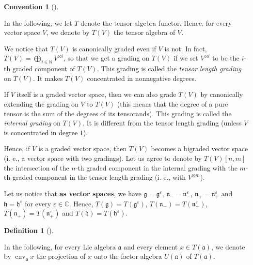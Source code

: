 \documentclass
[numbers=enddot,12pt,final,onecolumn,german,notitlepage]{scrartcl}%
\theoremstyle{definition}
\newtheorem{defi}[theo]{Definition}
\newenvironment{definition}[1][]
{\begin{defi}[#1]\begin{leftbar}}
{\end{leftbar}\end{defi}}
\newtheorem{conv}[theo]{Convention}
\newenvironment{Convention}[1][]
{\begin{conv}[#1]\begin{leftbar}}
{\end{leftbar}\end{conv}}
\begin{document}
\begin{Convention}
In the following, we let $T$ denote the tensor algebra functor. Hence, for
every vector space $V$, we denote by $T\left(  V\right)  $ the tensor algebra
of $V$.

We notice that $T\left(  V\right)  $ is canonically graded even if $V$ is not.
In fact, $T\left(  V\right)  =\bigoplus\limits_{i\in\mathbb{N}}V^{\otimes i}$,
so that we get a grading on $T\left(  V\right)  $ if we set $V^{\otimes i}$ to
be the $i$-th graded component of $T\left(  V\right)  $. This grading is
called the \textit{tensor length grading} on $T\left(  V\right)  $. It makes
$T\left(  V\right)  $ concentrated in nonnegative degrees.

If $V$ itself is a graded vector space, then we can also grade $T\left(
V\right)  $ by canonically extending the grading on $V$ to $T\left(  V\right)
$ (this means that the degree of a pure tensor is the sum of the degrees of
its tensorands). This grading is called the \textit{internal grading} on
$T\left(  V\right)  $. It is different from the tensor length grading (unless
$V$ is concentrated in degree $1$).

Hence, if $V$ is a graded vector space, then $T\left(  V\right)  $ becomes a
bigraded vector space (i. e., a vector space with two gradings). Let us agree
to denote by $T\left(  V\right)  \left[  n,m\right]  $ the intersection of the
$n$-th graded component in the internal grading with the $m$-th graded
component in the tensor length grading (i. e., with $V^{\otimes m}$).
\end{Convention}

Let us notice that \textbf{as vector spaces}, we have $\mathfrak{g}%
=\mathfrak{g}^{\varepsilon}$, $\mathfrak{n}_{-}=\mathfrak{n}_{-}^{\varepsilon
}$, $\mathfrak{n}_{+}=\mathfrak{n}_{+}^{\varepsilon}$ and $\mathfrak{h}%
=\mathfrak{h}^{\varepsilon}$ for every $\varepsilon\in\mathbb{C}$. Hence,
$T\left(  \mathfrak{g}\right)  =T\left(  \mathfrak{g}^{\varepsilon}\right)  $,
$T\left(  \mathfrak{n}_{-}\right)  =T\left(  \mathfrak{n}_{-}^{\varepsilon
}\right)  $, $T\left(  \mathfrak{n}_{+}\right)  =T\left(  \mathfrak{n}%
_{+}^{\varepsilon}\right)  $ and $T\left(  \mathfrak{h}\right)  =T\left(
\mathfrak{h}^{\varepsilon}\right)  $.

\begin{definition}
In the following, for every Lie algebra $\mathfrak{a}$ and every element $x\in
T\left(  \mathfrak{a}\right)  $, we denote by $\operatorname*{env}%
\nolimits_{\mathfrak{a}}x$ the projection of $x$ onto the factor algebra
$U\left(  \mathfrak{a}\right)  $ of $T\left(  \mathfrak{a}\right)  $.
\end{definition}
\end{document}

